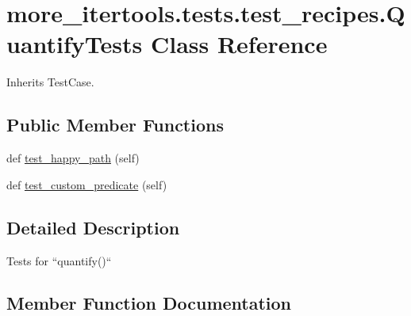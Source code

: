 \hypertarget{classmore__itertools_1_1tests_1_1test__recipes_1_1_quantify_tests}{}\section{more\+\_\+itertools.\+tests.\+test\+\_\+recipes.\+Quantify\+Tests Class Reference}
\label{classmore__itertools_1_1tests_1_1test__recipes_1_1_quantify_tests}


Inherits Test\+Case.

\subsection*{Public Member Functions}
\begin{DoxyCompactItemize}
\item 
def \hyperlink{classmore__itertools_1_1tests_1_1test__recipes_1_1_quantify_tests_afe082e94e0e64953c69d05824697b73d}{test\+\_\+happy\+\_\+path} (self)
\item 
def \hyperlink{classmore__itertools_1_1tests_1_1test__recipes_1_1_quantify_tests_ad96e00003cda2b52c61211c3f46f5671}{test\+\_\+custom\+\_\+predicate} (self)
\end{DoxyCompactItemize}


\subsection{Detailed Description}
\begin{DoxyVerb}Tests for ``quantify()``\end{DoxyVerb}
 

\subsection{Member Function Documentation}
\mbox{\label{classmore__itertools_1_1tests_1_1test__recipes_1_1_quantify_tests_ad96e00003cda2b52c61211c3f46f5671}} 
